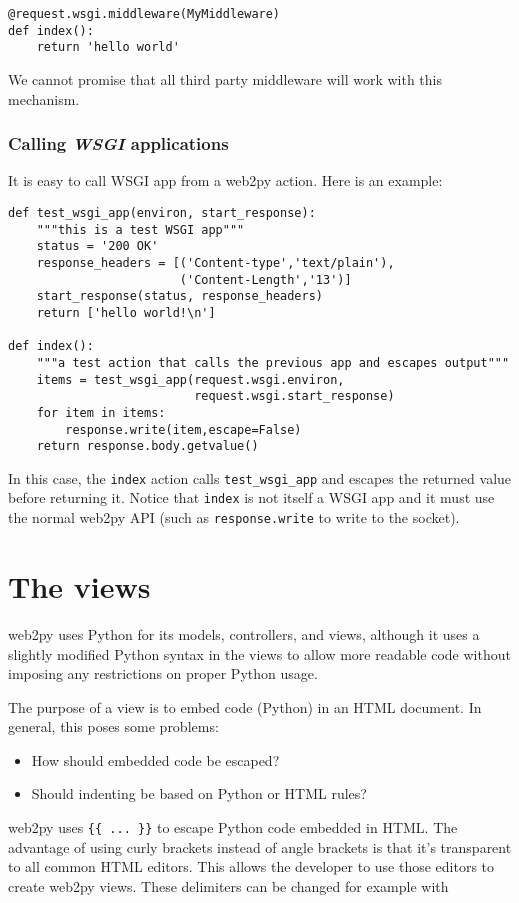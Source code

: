 \documentclass[justified,sixbynine,notoc]{tufte-book}
\def\ft{\small\tt}
\def\inxx#1{\index{#1}}
\begin{document}
\begin{fullwidth}
\begin{lstlisting}
@request.wsgi.middleware(MyMiddleware)
def index():
    return 'hello world'
\end{lstlisting}

We cannot promise that all third party middleware will work with this mechanism.

\goodbreak\subsection{Calling {\it WSGI} applications}

It is easy to call WSGI app from a web2py action. Here is an example:
\begin{lstlisting}
def test_wsgi_app(environ, start_response):
    """this is a test WSGI app"""
    status = '200 OK'
    response_headers = [('Content-type','text/plain'),
                        ('Content-Length','13')]
    start_response(status, response_headers)
    return ['hello world!\n']

def index():
    """a test action that calls the previous app and escapes output"""
    items = test_wsgi_app(request.wsgi.environ,
                          request.wsgi.start_response)
    for item in items:
        response.write(item,escape=False)
    return response.body.getvalue()
\end{lstlisting}

In this case, the {\ft index} action calls {\ft test\_wsgi\_app} and escapes the returned value before returning it. Notice that {\ft index} is not itself a WSGI app and it must use the normal web2py API (such as {\ft response.write} to write to the socket).

\goodbreak\chapter{The views}

\inxx{views} \inxx{template language} \inxx{HTML}
\noindent web2py uses Python for its models, controllers, and views, although it uses a slightly modified Python syntax in the views to allow more readable code without imposing any restrictions on proper Python usage.

The purpose of a view is to embed code (Python) in an HTML document. In general, this poses some problems:
\begin{itemize}
\item How should embedded code be escaped?

\item Should indenting be based on Python or HTML rules?
\end{itemize}
\noindent web2py uses {\ft \{\{ ... \}\}} to escape Python code embedded in HTML. The advantage of using curly brackets instead of angle brackets is that it's transparent to all common HTML editors. This allows the developer to use those editors to create web2py views. These delimiters can be changed for example with


\end{fullwidth}
\end{document}
